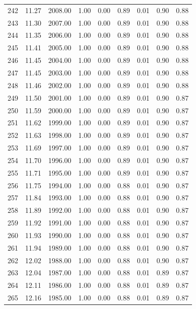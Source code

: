 \documentclass{article}\usepackage[]{graphicx}\usepackage[]{color}
\begin{document}
\begin{longtable}{rrrrrrrrr}
  242 & 11.27 & 2008.00 & 1.00 & 0.00 & 0.89 & 0.01 & 0.90 & 0.88 \\ 
  243 & 11.30 & 2007.00 & 1.00 & 0.00 & 0.89 & 0.01 & 0.90 & 0.88 \\ 
  244 & 11.35 & 2006.00 & 1.00 & 0.00 & 0.89 & 0.01 & 0.90 & 0.88 \\ 
  245 & 11.41 & 2005.00 & 1.00 & 0.00 & 0.89 & 0.01 & 0.90 & 0.88 \\ 
  246 & 11.45 & 2004.00 & 1.00 & 0.00 & 0.89 & 0.01 & 0.90 & 0.88 \\ 
  247 & 11.45 & 2003.00 & 1.00 & 0.00 & 0.89 & 0.01 & 0.90 & 0.88 \\ 
  248 & 11.46 & 2002.00 & 1.00 & 0.00 & 0.89 & 0.01 & 0.90 & 0.88 \\ 
  249 & 11.50 & 2001.00 & 1.00 & 0.00 & 0.89 & 0.01 & 0.90 & 0.87 \\ 
  250 & 11.59 & 2000.00 & 1.00 & 0.00 & 0.89 & 0.01 & 0.90 & 0.87 \\ 
  251 & 11.62 & 1999.00 & 1.00 & 0.00 & 0.89 & 0.01 & 0.90 & 0.87 \\ 
  252 & 11.63 & 1998.00 & 1.00 & 0.00 & 0.89 & 0.01 & 0.90 & 0.87 \\ 
  253 & 11.69 & 1997.00 & 1.00 & 0.00 & 0.89 & 0.01 & 0.90 & 0.87 \\ 
  254 & 11.70 & 1996.00 & 1.00 & 0.00 & 0.89 & 0.01 & 0.90 & 0.87 \\ 
  255 & 11.71 & 1995.00 & 1.00 & 0.00 & 0.89 & 0.01 & 0.90 & 0.87 \\ 
  256 & 11.75 & 1994.00 & 1.00 & 0.00 & 0.88 & 0.01 & 0.90 & 0.87 \\ 
  257 & 11.84 & 1993.00 & 1.00 & 0.00 & 0.88 & 0.01 & 0.90 & 0.87 \\ 
  258 & 11.89 & 1992.00 & 1.00 & 0.00 & 0.88 & 0.01 & 0.90 & 0.87 \\ 
  259 & 11.92 & 1991.00 & 1.00 & 0.00 & 0.88 & 0.01 & 0.90 & 0.87 \\ 
  260 & 11.93 & 1990.00 & 1.00 & 0.00 & 0.88 & 0.01 & 0.90 & 0.87 \\ 
  261 & 11.94 & 1989.00 & 1.00 & 0.00 & 0.88 & 0.01 & 0.90 & 0.87 \\ 
  262 & 12.02 & 1988.00 & 1.00 & 0.00 & 0.88 & 0.01 & 0.90 & 0.87 \\ 
  263 & 12.04 & 1987.00 & 1.00 & 0.00 & 0.88 & 0.01 & 0.89 & 0.87 \\ 
  264 & 12.11 & 1986.00 & 1.00 & 0.00 & 0.88 & 0.01 & 0.89 & 0.87 \\ 
  265 & 12.16 & 1985.00 & 1.00 & 0.00 & 0.88 & 0.01 & 0.89 & 0.87 \\ 

\end{longtable}
\end{document}
